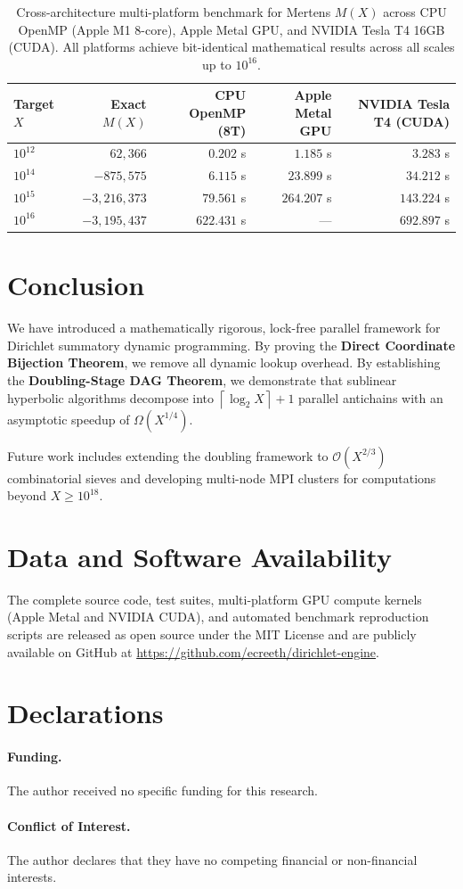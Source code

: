 \documentclass[11pt,a4paper]{article}
\theoremstyle{plain}
\theoremstyle{definition}
\newcommand{\Oh}{\mathcal{O}}
\newcommand{\ceil}[1]{\left\lceil #1 \right\rceil}
\begin{document}
\begin{table}[htbp]
\centering
\small
\begin{tabular}{@{}lrrrr@{}}
\toprule
\textbf{Target $X$} & \textbf{Exact $M(X)$} & \textbf{CPU OpenMP (8T)} & \textbf{Apple Metal GPU} & \textbf{NVIDIA Tesla T4 (CUDA)} \\
\midrule
$10^{12}$ & $62{,}366$   & $0.202$ s & $1.185$ s  & $3.283$ s \\
$10^{14}$ & $-875{,}575$ & $6.115$ s & $23.899$ s & $34.212$ s \\
$10^{15}$ & $-3{,}216{,}373$ & $79.561$ s & $264.207$ s & $143.224$ s \\
$10^{16}$ & $-3{,}195{,}437$ & $622.431$ s & --- & $692.897$ s \\
\bottomrule
\end{tabular}
\caption{Cross-architecture multi-platform benchmark for Mertens $M(X)$ across CPU OpenMP (Apple M1 8-core), Apple Metal GPU, and NVIDIA Tesla T4 16GB (CUDA). All platforms achieve bit-identical mathematical results across all scales up to $10^{16}$.}
\label{tab:gpu}
\end{table}

\section{Conclusion}

We have introduced a mathematically rigorous, lock-free parallel framework for Dirichlet summatory dynamic programming. By proving the \textbf{Direct Coordinate Bijection Theorem}, we remove all dynamic lookup overhead. By establishing the \textbf{Doubling-Stage DAG Theorem}, we demonstrate that sublinear hyperbolic algorithms decompose into $\ceil{\log_2 X} + 1$ parallel antichains with an asymptotic speedup of $\Omega(X^{1/4})$.

Future work includes extending the doubling framework to $\Oh(X^{2/3})$ combinatorial sieves \cite{deleglise1996computing, hurst2026practical} and developing multi-node MPI clusters for computations beyond $X \ge 10^{18}$.

\section*{Data and Software Availability}
The complete source code, test suites, multi-platform GPU compute kernels (Apple Metal and NVIDIA CUDA), and automated benchmark reproduction scripts are released as open source under the MIT License and are publicly available on GitHub at \url{https://github.com/ecreeth/dirichlet-engine}.

\section*{Declarations}
\paragraph{Funding.} The author received no specific funding for this research.
\paragraph{Conflict of Interest.} The author declares that they have no competing financial or non-financial interests.



\end{document}
